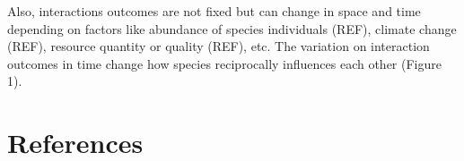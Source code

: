 \documentclass[a4paper, 12pt]{article}
\begin{document}
\par Also, interactions outcomes are not fixed but can change in space and time depending on factors like abundance of species individuals (REF), climate change (REF), resource quantity or quality (REF), etc. The variation on interaction outcomes in time change how species reciprocally influences each other (Figure 1).  


\section{References}
\end{document}
